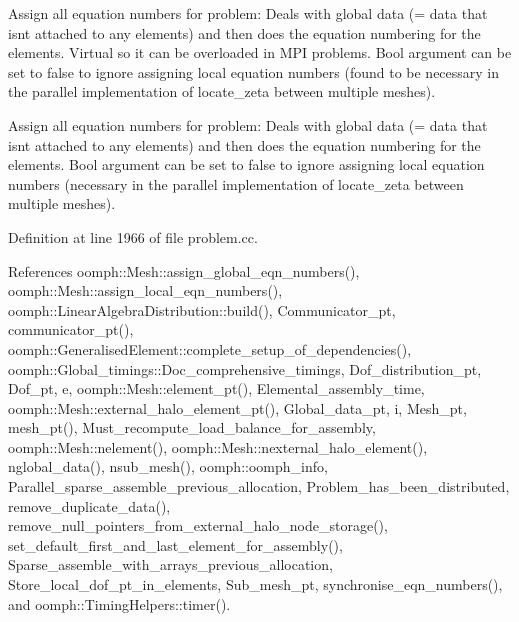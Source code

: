 Assign all equation numbers for problem\+: Deals with global data (= data that isn\textquotesingle{}t attached to any elements) and then does the equation numbering for the elements. Virtual so it can be overloaded in M\+PI problems. Bool argument can be set to false to ignore assigning local equation numbers (found to be necessary in the parallel implementation of locate\+\_\+zeta between multiple meshes). 

Assign all equation numbers for problem\+: Deals with global data (= data that isn\textquotesingle{}t attached to any elements) and then does the equation numbering for the elements. Bool argument can be set to false to ignore assigning local equation numbers (necessary in the parallel implementation of locate\+\_\+zeta between multiple meshes). 

Definition at line 1966 of file problem.\+cc.



References oomph\+::\+Mesh\+::assign\+\_\+global\+\_\+eqn\+\_\+numbers(), oomph\+::\+Mesh\+::assign\+\_\+local\+\_\+eqn\+\_\+numbers(), oomph\+::\+Linear\+Algebra\+Distribution\+::build(), Communicator\+\_\+pt, communicator\+\_\+pt(), oomph\+::\+Generalised\+Element\+::complete\+\_\+setup\+\_\+of\+\_\+dependencies(), oomph\+::\+Global\+\_\+timings\+::\+Doc\+\_\+comprehensive\+\_\+timings, Dof\+\_\+distribution\+\_\+pt, Dof\+\_\+pt, e, oomph\+::\+Mesh\+::element\+\_\+pt(), Elemental\+\_\+assembly\+\_\+time, oomph\+::\+Mesh\+::external\+\_\+halo\+\_\+element\+\_\+pt(), Global\+\_\+data\+\_\+pt, i, Mesh\+\_\+pt, mesh\+\_\+pt(), Must\+\_\+recompute\+\_\+load\+\_\+balance\+\_\+for\+\_\+assembly, oomph\+::\+Mesh\+::nelement(), oomph\+::\+Mesh\+::nexternal\+\_\+halo\+\_\+element(), nglobal\+\_\+data(), nsub\+\_\+mesh(), oomph\+::oomph\+\_\+info, Parallel\+\_\+sparse\+\_\+assemble\+\_\+previous\+\_\+allocation, Problem\+\_\+has\+\_\+been\+\_\+distributed, remove\+\_\+duplicate\+\_\+data(), remove\+\_\+null\+\_\+pointers\+\_\+from\+\_\+external\+\_\+halo\+\_\+node\+\_\+storage(), set\+\_\+default\+\_\+first\+\_\+and\+\_\+last\+\_\+element\+\_\+for\+\_\+assembly(), Sparse\+\_\+assemble\+\_\+with\+\_\+arrays\+\_\+previous\+\_\+allocation, Store\+\_\+local\+\_\+dof\+\_\+pt\+\_\+in\+\_\+elements, Sub\+\_\+mesh\+\_\+pt, synchronise\+\_\+eqn\+\_\+numbers(), and oomph\+::\+Timing\+Helpers\+::timer().



